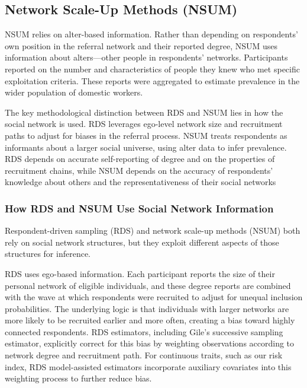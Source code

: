 \documentclass[
  12pt,
  letterpaper,
  DIV=11,
  numbers=noendperiod]{scrartcl}
\theoremstyle{plain}
\theoremstyle{definition}
\begin{document}
\subsection{Network Scale-Up Methods
(NSUM)}\label{network-scale-up-methods-nsum}

NSUM relies on alter-based information. Rather than depending on
respondents' own position in the referral network and their reported
degree, NSUM uses information about alters---other people in
respondents' networks. Participants reported on the number and
characteristics of people they knew who met specific exploitation
criteria. These reports were aggregated to estimate prevalence in the
wider population of domestic workers.

The key methodological distinction between RDS and NSUM lies in how the
social network is used. RDS leverages ego-level network size and
recruitment paths to adjust for biases in the referral process. NSUM
treats respondents as informants about a larger social universe, using
alter data to infer prevalence. RDS depends on accurate self-reporting
of degree and on the properties of recruitment chains, while NSUM
depends on the accuracy of respondents' knowledge about others and the
representativeness of their social networks

\subsubsection{How RDS and NSUM Use Social Network
Information}\label{how-rds-and-nsum-use-social-network-information}

Respondent-driven sampling (RDS) and network scale-up methods (NSUM)
both rely on social network structures, but they exploit different
aspects of those structures for inference.

RDS uses ego-based information. Each participant reports the size of
their personal network of eligible individuals, and these degree reports
are combined with the wave at which respondents were recruited to adjust
for unequal inclusion probabilities. The underlying logic is that
individuals with larger networks are more likely to be recruited earlier
and more often, creating a bias toward highly connected respondents. RDS
estimators, including Gile's successive sampling estimator, explicitly
correct for this bias by weighting observations according to network
degree and recruitment path. For continuous traits, such as our risk
index, RDS model-assisted estimators incorporate auxiliary covariates
into this weighting process to further reduce bias.
\end{document}
